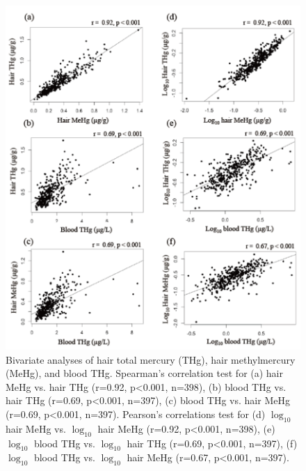 \begin{figure}
  \centering
    \label{fig:Fig29}
  \includegraphics[scale=1]{Figures/Fig29.pdf}
  \caption[Bivariate analyses of hair total mercury, hair methylmercury, and blood total mercury.]{Bivariate analyses of hair total mercury (THg), hair methylmercury (MeHg), and blood THg. Spearman's correlation test for (a) hair MeHg vs. hair THg (r=0.92, p<0.001, n=398), (b) blood THg vs. hair THg (r=0.69, p<0.001, n=397), (c) blood THg vs. hair MeHg (r=0.69, p<0.001, n=397). Pearson's correlations test for (d) $\log_{10}$ hair MeHg vs. $\log_{10}$ hair MeHg (r=0.92, p<0.001, n=398), (e) $\log_{10}$ blood THg vs. $\log_{10}$ hair THg (r=0.69, p<0.001, n=397), (f) $\log_{10}$ blood THg vs. $\log_{10}$ hair MeHg (r=0.67, p<0.001, n=397).}
\end{figure}

